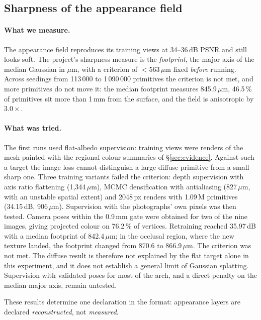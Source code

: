 \documentclass[11pt,a4paper]{article}
\begin{document}
\subsection{Sharpness of the appearance field}

\paragraph{What we measure.} The appearance field reproduces its training views at
34--36\,dB PSNR and still looks soft. The project's sharpness measure is the
\emph{footprint}, the major axis of the median Gaussian in $\mu$m, with a criterion
of $<563\,\mu$m fixed \emph{before} running. Across seedings from 113\,000 to 1\,090\,000
primitives the criterion is not met, and more primitives do not move it: the median
footprint measures 845.9\,$\mu$m, 46.5\,\% of primitives sit more than 1\,mm from the
surface, and the field is anisotropic by $3.0\times$.

\paragraph{What was tried.} The first runs used flat-albedo supervision: training views
were renders of the mesh painted with the regional colour summaries of \S\ref{sec:evidence}.
Against such a target the image loss cannot distinguish a large diffuse primitive from a
small sharp one. Three training variants failed the criterion: depth supervision with axis
ratio flattening (1{,}344\,$\mu$m), MCMC densification with antialiasing (827\,$\mu$m, with
an unstable spatial extent) and 2048\,px renders with 1.09\,M primitives (34.15\,dB,
906\,$\mu$m). Supervision with the photographs' own pixels was then tested. Camera poses
within the 0.9\,mm gate were obtained for two of the nine images, giving projected colour on
76.2\,\% of vertices. Retraining reached 35.97\,dB with a median footprint of
842.4\,$\mu$m; in the occlusal region, where the new texture landed, the footprint changed
from 870.6 to 866.9\,$\mu$m. The criterion was not met. The diffuse result is therefore not
explained by the flat target alone in this experiment, and it does not establish a general
limit of Gaussian splatting. Supervision with validated poses for most of the arch, and a
direct penalty on the median major axis, remain untested.

These results determine one declaration in the format: appearance layers are declared
\emph{reconstructed}, not \emph{measured}.


\end{document}
